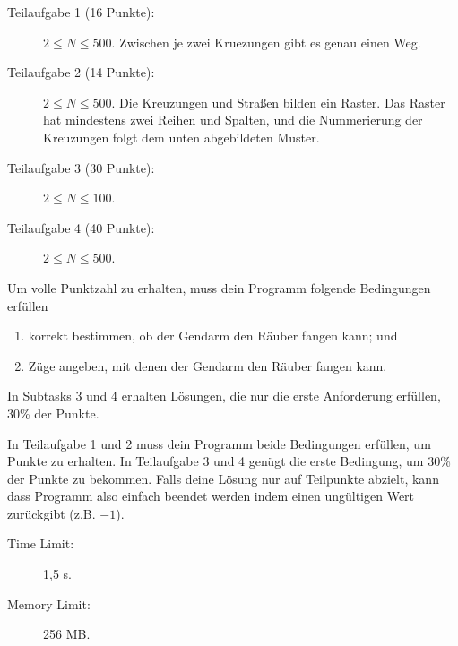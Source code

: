 \documentclass{boi2014-de}
\begin{document}
    \begin{description}
        \item[Teilaufgabe 1 (16 Punkte):] $2 \le N \le 500$. 
        Zwischen je zwei Kruezungen gibt es genau einen Weg.
        \item[Teilaufgabe 2 (14 Punkte):] $2 \le N \le 500$. 
        Die Kreuzungen und Straßen bilden ein Raster.  Das Raster hat mindestens zwei Reihen und Spalten,
        und die Nummerierung der Kreuzungen folgt dem unten abgebildeten Muster.
        \begin{figure}[h!]
           \centering
        \end{figure}
        \item[Teilaufgabe 3 (30 Punkte):] $2 \le N \le 100$.
        \item[Teilaufgabe 4 (40 Punkte):] $2 \le N \le 500$.
    \end{description}
    
    Um volle Punktzahl zu erhalten, muss dein Programm folgende Bedingungen erfüllen
    \begin{enumerate}
    	\item korrekt bestimmen, ob der Gendarm den Räuber fangen kann; und
	\item Züge angeben, mit denen der Gendarm den Räuber fangen kann.
    \end{enumerate}
    
    In Subtasks 3 und 4 erhalten Lösungen, 
    die nur die erste Anforderung erfüllen, 30\% der Punkte.
    
    In Teilaufgabe 1 und 2 muss dein Programm beide Bedingungen erfüllen, um Punkte zu erhalten.
    In Teilaufgabe 3 und 4 genügt die erste Bedingung, um 30\% der Punkte zu bekommen.
    Falls deine Lösung nur auf Teilpunkte abzielt, kann dass Programm also einfach beendet werden indem  einen ungültigen Wert zurückgibt (z.B. $-1$).

    \Constraints
    
    \begin{description}
        \item[Time Limit:] 1,5 s.
        \item[Memory Limit:] 256 MB.
    \end{description}
\end{document}
